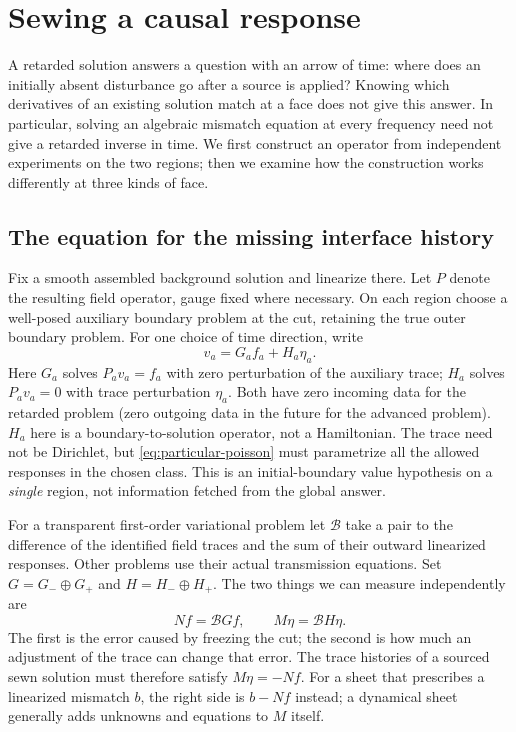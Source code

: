 \chapter{Sewing a causal response}\label{ch:08}
A retarded solution answers a question with an arrow of time: where does an initially absent disturbance go after a source is applied? Knowing which derivatives of an existing solution match at a face does not give this answer. In particular, solving an algebraic mismatch equation at every frequency need not give a retarded inverse in time. We first construct an operator from independent experiments on the two regions; then we examine how the construction works differently at three kinds of face.

\section{The equation for the missing interface history}
Fix a smooth assembled background solution and linearize there. Let $P$ denote the resulting field operator, gauge fixed where necessary. On each region choose a well-posed auxiliary boundary problem at the cut, retaining the true outer boundary problem. For one choice of time direction, write
\begin{equation}
 v_a=G_a f_a+H_a\eta_a .\label{eq:particular-poisson}
\end{equation}
Here $G_a$ solves $P_a v_a=f_a$ with zero perturbation of the auxiliary trace; $H_a$ solves $P_a v_a=0$ with trace perturbation $\eta_a$. Both have zero incoming data for the retarded problem (zero outgoing data in the future for the advanced problem). $H_a$ here is a boundary-to-solution operator, not a Hamiltonian. The trace need not be Dirichlet, but \eqref{eq:particular-poisson} must parametrize all the allowed responses in the chosen class. This is an initial-boundary value hypothesis on a \emph{single} region, not information fetched from the global answer.

For a transparent first-order variational problem let $\mathcal B$ take a pair to the difference of the identified field traces and the sum of their outward linearized responses. Other problems use their actual transmission equations. Set $G=G_-\oplus G_+$ and $H=H_-\oplus H_+$. The two things we can measure independently are
\[
 Nf=\mathcal B Gf,\qquad M\eta=\mathcal B H\eta.
\]
The first is the error caused by freezing the cut; the second is how much an adjustment of the trace can change that error. The trace histories of a sourced sewn solution must therefore satisfy $M\eta=-Nf$. For a sheet that prescribes a linearized mismatch $b$, the right side is $b-Nf$ instead; a dynamical sheet generally adds unknowns and equations to $M$ itself.

